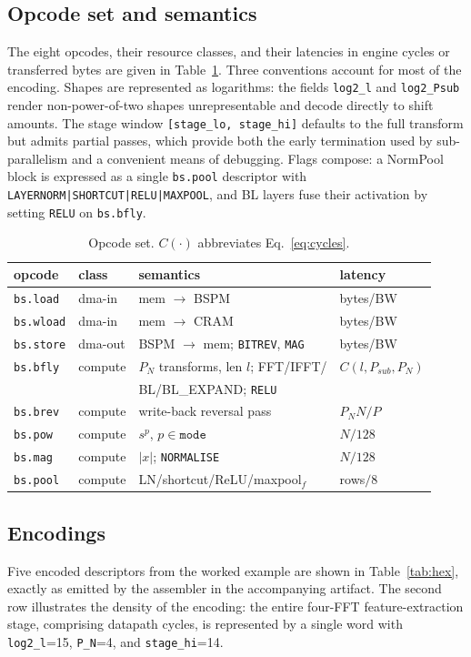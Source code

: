 \documentclass[twocolumn,10pt]{article}
\newcommand{\Psub}{P_{sub}}
\newcommand{\PN}{P_{N}}
\newcommand{\op}[1]{\texttt{#1}}
\begin{document}
\subsection{Opcode set and semantics}
The eight opcodes, their resource classes, and their latencies in engine cycles
or transferred bytes are given in Table~\ref{tab:opcodes}.  Three conventions
account for most of the encoding.  Shapes are represented as logarithms: the
fields \texttt{log2\_l} and \texttt{log2\_Psub} render non-power-of-two shapes
unrepresentable and decode directly to shift amounts.  The stage window
\texttt{[stage\_lo, stage\_hi]} defaults to the full transform but admits
partial passes, which provide both the early termination used by
sub-parallelism and a convenient means of debugging.  Flags compose: a NormPool
block is expressed as a single \op{bs.pool} descriptor with
\texttt{LAYERNORM|SHORTCUT|RELU|MAXPOOL}, and BL layers fuse their activation by
setting \texttt{RELU} on \op{bs.bfly}.

\begin{table}[t]
\centering\small
\caption{Opcode set.  $C(\cdot)$ abbreviates Eq.~\ref{eq:cycles}.}
\label{tab:opcodes}
\setlength{\tabcolsep}{3pt}
\begin{tabular}{@{}llll@{}}
\toprule
opcode & class & semantics & latency \\
\midrule
\op{bs.load}  & dma-in  & mem $\to$ BSPM & bytes/BW \\
\op{bs.wload} & dma-in  & mem $\to$ CRAM & bytes/BW \\
\op{bs.store} & dma-out & BSPM $\to$ mem; \texttt{BITREV}, \texttt{MAG} & bytes/BW \\
\op{bs.bfly}  & compute & $\PN$ transforms, len $l$; FFT/IFFT/ & $C(l,\Psub,\PN)$ \\
              &         & \quad BL/BL\_EXPAND; \texttt{RELU} & \\
\op{bs.brev}  & compute & write-back reversal pass & $\PN N/P$ \\
\op{bs.pow}   & compute & $s^p$, $p \in \texttt{mode}$ & $N/128$ \\
\op{bs.mag}   & compute & $|x|$; \texttt{NORMALISE} & $N/128$ \\
\op{bs.pool}  & compute & LN/shortcut/ReLU/maxpool$_f$ & rows$/8$ \\
\bottomrule
\end{tabular}
\end{table}

\subsection{Encodings}
Five encoded descriptors from the worked example are shown in
Table~\ref{tab:hex}, exactly as emitted by the assembler in the accompanying
artifact.  The second row illustrates the density of the encoding: the entire
four-FFT feature-extraction stage, comprising \HeadlineCycles{} datapath cycles,
is represented by a single word with \texttt{log2\_l}=15, \texttt{P\_N}=4, and
\texttt{stage\_hi}=14.
\end{document}
